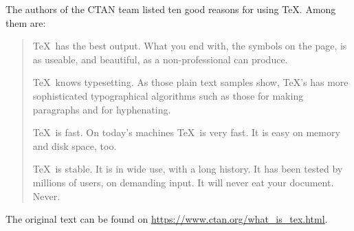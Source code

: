 \documentclass{article}
\begin{document}
The authors of the CTAN team listed ten good reasons
for using \TeX. Among them are:
\begin{quotation}
\TeX\ has the best output. What you end with,
the symbols on the page, is as useable, and beautiful,
as a non-professional can produce.

\TeX\ knows typesetting. As those plain text samples
show, TeX's has more sophisticated typographical algorithms
such as those for making paragraphs and for hyphenating.

\TeX\ is fast. On today's machines \TeX\ is very fast.
It is easy on memory and disk space, too.

\TeX\ is stable. It is in wide use, with a long history.
It has been tested by millions of users, on demanding input.
It will never eat your document. Never.
\end{quotation}
The original text can be found on
\url{https://www.ctan.org/what_is_tex.html}.
\end{document}
